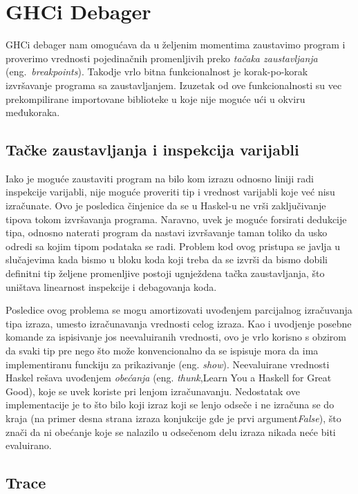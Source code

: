 \documentclass[a4paper]{article}
\begin{document}
{{\section{GHCi Debager}
GHCi debager nam omogućava da u željenim momentima zaustavimo program i proverimo vrednosti pojedinačnih promenljivih preko {\em tačaka zaustavljanja} (eng.~{\em breakpoints}). Takodje vrlo bitna funkcionalnost je korak-po-korak izvršavanje programa sa zaustavljanjem. Izuzetak od ove funkcionalnosti su vec prekompilirane importovane biblioteke u koje nije moguće ući u okviru međukoraka.


\subsection{Tačke zaustavljanja i inspekcija varijabli}
Iako je moguće zaustaviti program na bilo kom izrazu odnosno liniji radi inspekcije varijabli, nije moguće proveriti tip i vrednost varijabli koje već nisu izračunate. Ovo je posledica činjenice da se u Haskel-u ne vrši zaključivanje tipova tokom izvršavanja programa. Naravno, uvek je moguće forsirati dedukcije tipa, odnosno naterati program da nastavi izvršavanje taman toliko da usko odredi sa kojim tipom podataka se radi. Problem kod ovog pristupa se javlja u slučajevima kada bismo u bloku koda koji treba da se izvrši da bismo dobili definitni tip željene promenljive postoji ugnježdena tačka zaustavljanja, što uništava linearnost inspekcije i debagovanja koda. 

Posledice ovog problema se mogu amortizovati uvođenjem parcijalnog izračuvanja tipa izraza, umesto izračunavanja vrednosti celog izraza. Kao i uvodjenje posebne komande za ispisivanje jos neevaluiranih vrednosti, ovo je vrlo korisno s obzirom da svaki tip pre nego što može konvencionalno da se ispisuje mora da ima implementiranu funckiju za prikazivanje (eng. {\em show}). Neevaluirane vrednosti Haskel rešava uvođenjem {\em obećanja} (eng. {\em thunk},Learn You a Haskell for Great Good), koje se uvek koriste pri lenjom izračunavanju. Nedostatak ove implementacije je to što bilo koji izraz koji se lenjo odseče i ne izračuna se do kraja (na primer desna strana izraza konjukcije gde je prvi argument{\em False}), što znači da ni obećanje koje se nalazilo u odsečenom delu izraza nikada neće biti evaluirano. 


\subsection{Trace}

}}
\end{document}
